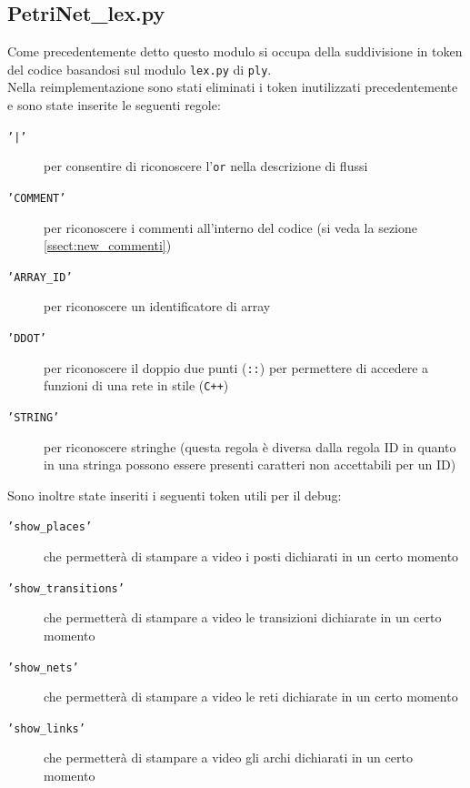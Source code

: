 \documentclass[italian,12pt]{book}
\begin{document}
\subsection{PetriNet\_lex.py}
Come precedentemente detto questo modulo si occupa della suddivisione in token del codice basandosi sul modulo {\tt lex.py} di {\tt ply}.\\
Nella reimplementazione sono stati eliminati i token inutilizzati precedentemente e sono state inserite le seguenti regole:
\begin{description}

\item[{\tt '|'}] per consentire di riconoscere l'{\tt or} nella descrizione di flussi

\item[{\tt 'COMMENT'}] per riconoscere i commenti all'interno del codice (si veda la sezione \ref{ssect:new_commenti})

\item[{\tt 'ARRAY\_ID'}] per riconoscere un identificatore di array

\item[{\tt 'DDOT'}] per riconoscere il doppio due punti ({\tt ::}) per permettere di accedere a funzioni di una rete in stile ({\tt C++})

\item[{\tt 'STRING'}] per riconoscere stringhe (questa regola è diversa dalla regola ID in quanto in una stringa possono essere presenti caratteri non accettabili per un ID)

\end{description}

Sono inoltre state inseriti i seguenti token utili per il debug:
\begin{description}

\item[{\tt 'show\_places'}] che permetterà di stampare a video i posti dichiarati in un certo momento

\item[{\tt 'show\_transitions'}] che permetterà di stampare a video le transizioni dichiarate in un certo momento

\item[{\tt 'show\_nets'}] che permetterà di stampare a video le reti dichiarate in un certo momento

\item[{\tt 'show\_links'}] che permetterà di stampare a video gli archi dichiarati in un certo momento

\end{description}
\end{document}
